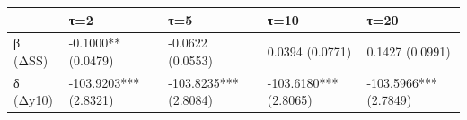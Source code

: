 \begin{tabular}{lllll}
\toprule
 & τ=2 & τ=5 & τ=10 & τ=20 \\
\midrule
β (ΔSS) & -0.1000**
(0.0479) & -0.0622
(0.0553) & 0.0394
(0.0771) & 0.1427
(0.0991) \\
δ (Δy10) & -103.9203***
(2.8321) & -103.8235***
(2.8084) & -103.6180***
(2.8065) & -103.5966***
(2.7849) \\
\bottomrule
\end{tabular}
